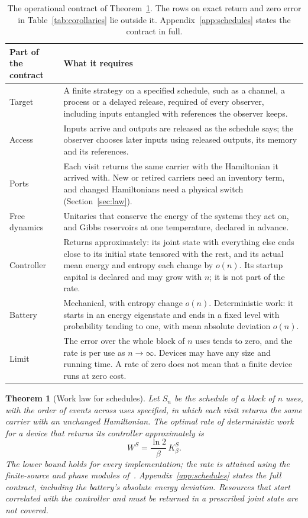 \documentclass[11pt]{article}
\newtheorem{theorem}{Theorem}
\theoremstyle{definition}
\theoremstyle{remark}
\begin{document}
\begin{table}[tbp]
\centering
\small
\begin{tabular}{@{}>{\raggedright\arraybackslash}p{2.6cm}>{\raggedright\arraybackslash}p{12.2cm}@{}}
\toprule
Part of the contract & What it requires\\
\midrule
Target & A finite strategy on a specified schedule, such as a channel, a process or a delayed release, required of every observer, including inputs entangled with references the observer keeps.\\
Access & Inputs arrive and outputs are released as the schedule says; the observer chooses later inputs using released outputs, its memory and its references.\\
Ports & Each visit returns the same carrier with the Hamiltonian it arrived with. New or retired carriers need an inventory term, and changed Hamiltonians need a physical switch (Section~\ref{sec:law}).\\
Free dynamics & Unitaries that conserve the energy of the systems they act on, and Gibbs reservoirs at one temperature, declared in advance.\\
Controller & Returns approximately: its joint state with everything else ends close to its initial state tensored with the rest, and its actual mean energy and entropy each change by $o(n)$. Its startup capital is declared and may grow with $n$; it is not part of the rate.\\
Battery & Mechanical, with entropy change $o(n)$. Deterministic work: it starts in an energy eigenstate and ends in a fixed level with probability tending to one, with mean absolute deviation $o(n)$.\\
Limit & The error over the whole block of $n$ uses tends to zero, and the rate is per use as $n\to\infty$. Devices may have any size and running time. A rate of zero does not mean that a finite device runs at zero cost.\\
\bottomrule
\end{tabular}
\caption{The operational contract of Theorem~\ref{thm:law}. The rows on exact return and zero error in Table~\ref{tab:corollaries} lie outside it. Appendix~\ref{app:schedules} states the contract in full.}\label{tab:contract}
\end{table}

\begin{theorem}[Work law for schedules]\label{thm:law}
Let $S_n$ be the schedule of a block of $n$ uses, with the order of events across uses specified, in which each visit returns the same carrier with an unchanged Hamiltonian. The optimal rate of deterministic work for a device that returns its controller approximately is
\[
W^S=\frac{\ln2}{\beta}\,K_\beta^S.
\]
The lower bound holds for every implementation; the rate is attained using the finite-source and phase modules of~\cite[App.~E]{Answering}. Appendix~\ref{app:schedules} states the full contract, including the battery's absolute energy deviation. Resources that start correlated with the controller and must be returned in a prescribed joint state are not covered.
\end{theorem}
\end{document}
